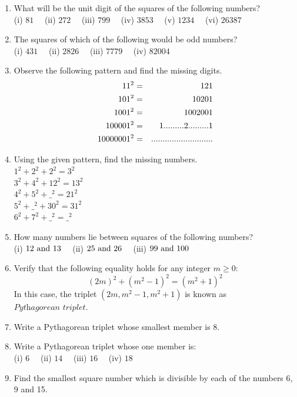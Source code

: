 \documentclass[a4paper,leqno,12pt]{amsart}
\begin{document}
\begin{enumerate}
\setlength\itemsep{1em}
\item What will be the unit digit of the squares of the following numbers?\\
(i) $81 \quad$ (ii) $272 \quad$ (iii) $799 \quad $ (iv) $3853 \quad $ (v) $1234 \quad $ (vi) $26387$

\item The squares of which of the following would be odd numbers? \\
(i) $431 \quad$ (ii) $2826 \quad$ (iii) $7779 \quad $ (iv) $82004$

\item Observe the following pattern and find the missing digits.
\begin{eqnarray*}
 11^2 &=& 121 \cr
 101^2 &=& 10201 \cr 
 1001^2 &=& 1002001 \cr
 100001^2 &=& 1 ......... 2 ......... 1 \cr
 10000001^2 &=& ...........................
\end{eqnarray*}

\item Using the given pattern, find the missing numbers.\\
$1^2 + 2^2 + 2^2 = 3^2$\\
$3^2 + 4^2 + 12^2 = 13^2$\\
$4^2 + 5^2 + \_^2 = 21^2$\\
$5^2 + \_^2 + 30^2 = 31^2$\\
$6^2 + 7^2 + \_^2 = \_^2$

\item How many numbers lie between squares of the following numbers?\\
(i) $12 \ {\rm and} \ 13 \quad$ (ii) $25 \ {\rm and} \ 26 \quad$ (iii) $99 \ {\rm and} \ 100$


\item Verify that the following equality holds for any integer $m \geq 0$:
\[
(2m)^2 + (m^2 - 1)^2 = (m^2 + 1)^2
\]
In this case, the triplet $(2m, m^2 -1, m^2 +1)$ is known as $\textit{Pythagorean triplet}$.

\item Write a Pythagorean triplet whose smallest member is 8.

\item Write a Pythagorean triplet whose one member is:\\
(i) $6 \quad $ (ii) $14 \quad$ (iii) $16 \quad$ (iv) $18$ 

\item Find the smallest square number which is divisible by each of the numbers 6, 9 and 15. 


\end{enumerate}
\end{document}
